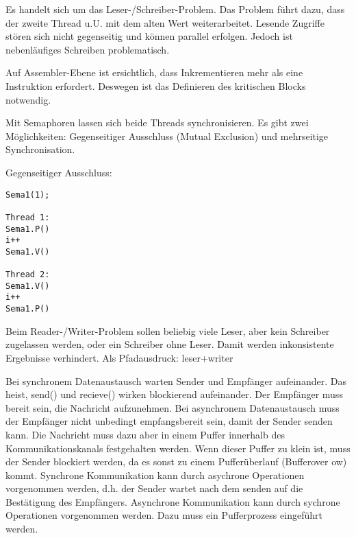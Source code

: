 \begin{answer}
Es handelt sich um das Leser-/Schreiber-Problem. Das Problem führt dazu, dass der zweite Thread u.U. mit dem alten Wert weiterarbeitet. Lesende Zugriffe stören sich nicht gegenseitig und können parallel erfolgen. Jedoch ist nebenläufiges Schreiben problematisch.

Auf Assembler-Ebene ist ersichtlich, dass Inkrementieren mehr als eine Instruktion erfordert. Deswegen ist das Definieren des kritischen Blocks notwendig.

Mit Semaphoren lassen sich beide Threads synchronisieren. Es gibt zwei Möglichkeiten: Gegenseitiger Ausschluss (Mutual Exclusion) und mehrseitige Synchronisation.

Gegenseitiger Ausschluss:

\begin{verbatim}
Sema1(1);

Thread 1:
Sema1.P()
i++
Sema1.V()

Thread 2:
Sema1.V()
i++
Sema1.P()
\end{verbatim}
\end{answer}

\begin{answer}
Beim Reader-/Writer-Problem sollen beliebig viele Leser, aber kein Schreiber zugelassen werden,
oder ein Schreiber ohne Leser. Damit werden inkonsistente Ergebnisse verhindert.
Als Pfadausdruck: leser+writer
\end{answer}

\begin{answer}
Bei synchronem Datenaustausch warten Sender und Empfänger aufeinander. Das heist, send()
und recieve() wirken blockierend aufeinander. Der Empfänger muss bereit sein, die Nachricht aufzunehmen.
Bei asynchronem Datenaustausch muss der Empfänger nicht unbedingt empfangsbereit sein, damit
der Sender senden kann. Die Nachricht muss dazu aber in einem Puffer innerhalb des Kommunikationskanals
festgehalten werden. Wenn dieser Puffer zu klein ist, muss der Sender blockiert
werden, da es sonst zu einem Pufferüberlauf (Bufferover
ow) kommt.
Synchrone Kommunikation kann durch asychrone Operationen vorgenommen werden, d.h. der
Sender wartet nach dem senden auf die Bestätigung des Empfängers.
Asynchrone Kommunikation kann durch sychrone Operationen vorgenommen werden. Dazu muss
ein Pufferprozess eingeführt werden.
\end{answer}


